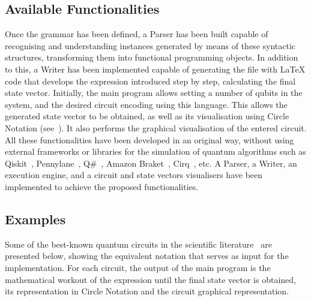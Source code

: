\documentclass[sigconf,natbib=false]{acmart}
\begin{document}
\subsection{Available Functionalities}
Once the grammar has been defined, a Parser has been built capable of recognising and understanding instances generated by means of these syntactic structures, transforming them into functional programming objects. In addition to this, a Writer has been implemented capable of generating the file with \LaTeX{} code that develops the expression introduced step by step, calculating the final state vector. Initially, the main program allows setting a number of qubits in the system, and the desired circuit encoding using this language. This allows the generated state vector to be obtained, as well as its visualisation using Circle Notation (see~\cite{Gimeno-Segovia_Harrigan_Johnston_2019}). It also performs the graphical visualisation of the entered circuit. All these functionalities have been developed in an original way, without using external frameworks or libraries for the simulation of quantum algorithms such as Qiskit~\cite{Qiskit}, Pennylane~\cite{Pennylane}, Q\#~\cite{QSharp}, Amazon Braket~\cite{Braket}, Cirq~\cite{Cirq}, etc. A Parser, a Writer, an execution engine, and a circuit and state vectors visualisers have been implemented to achieve the proposed functionalities.

\subsection{Examples}
Some of the best-known quantum circuits in the scientific literature~\cite{Nielsen_Chuang_2010} are presented below, showing the equivalent notation that serves as input for the implementation. For each circuit, the output of the main program is the mathematical workout of the expression until the final state vector is obtained, its representation in Circle Notation and the circuit graphical representation.
\end{document}
